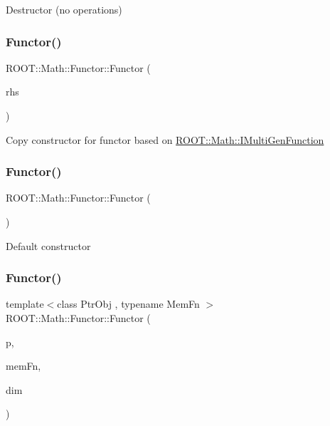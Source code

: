 Destructor (no operations) \mbox{\label{classROOT_1_1Math_1_1Functor_a001bfe27e95032f05685167e77e0efbd}} 
\subsubsection{\texorpdfstring{Functor()}{Functor()}\hspace{0.1cm}{\footnotesize\ttfamily [4/8]}}
{\footnotesize\ttfamily R\+O\+O\+T\+::\+Math\+::\+Functor\+::\+Functor (\begin{DoxyParamCaption}\item[{const \mbox{\hyperlink{classROOT_1_1Math_1_1Functor}{Functor}} \&}]{rhs }\end{DoxyParamCaption})\hspace{0.3cm}{\ttfamily [inline]}}

Copy constructor for functor based on \mbox{\hyperlink{namespaceROOT_1_1Math_aec22897f3d759f7c284893c81d980799}{R\+O\+O\+T\+::\+Math\+::\+I\+Multi\+Gen\+Function}} \mbox{\label{classROOT_1_1Math_1_1Functor_a2330648eca94b53b3ba613e49d03927f}} 
\subsubsection{\texorpdfstring{Functor()}{Functor()}\hspace{0.1cm}{\footnotesize\ttfamily [5/8]}}
{\footnotesize\ttfamily R\+O\+O\+T\+::\+Math\+::\+Functor\+::\+Functor (\begin{DoxyParamCaption}{ }\end{DoxyParamCaption})\hspace{0.3cm}{\ttfamily [inline]}}

Default constructor \mbox{\label{classROOT_1_1Math_1_1Functor_ad6dbce8351bd8c74e6754215a3ccac41}} 
\subsubsection{\texorpdfstring{Functor()}{Functor()}\hspace{0.1cm}{\footnotesize\ttfamily [6/8]}}
{\footnotesize\ttfamily template$<$class Ptr\+Obj , typename Mem\+Fn $>$ \\
R\+O\+O\+T\+::\+Math\+::\+Functor\+::\+Functor (\begin{DoxyParamCaption}\item[{const Ptr\+Obj \&}]{p,  }\item[{Mem\+Fn}]{mem\+Fn,  }\item[{unsigned int}]{dim }\end{DoxyParamCaption})\hspace{0.3cm}{\ttfamily [inline]}}

